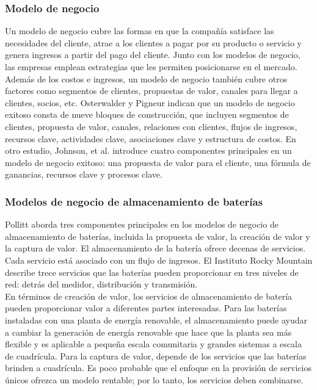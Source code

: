 \documentclass[10pt]{beamer}
\begin{document}
\begin{frame}
\frametitle{Modelo de negocio}
Un modelo de negocio cubre las formas en que la compañía satisface las necesidades del cliente, atrae a los clientes a pagar por su producto o servicio y genera ingresos a partir del pago del cliente. Junto con los modelos de negocio, las empresas emplean estrategias que les permiten posicionarse en el mercado. Además de los costos e ingresos, un modelo de negocio también cubre otros factores como segmentos de clientes, propuestas de valor, canales para llegar a clientes, socios, etc. Osterwalder y Pigneur indican que un modelo de negocio exitoso consta de nueve bloques de construcción, que incluyen segmentos de clientes, propuesta de valor, canales, relaciones con clientes, flujos de ingresos, recursos clave, actividades clave, asociaciones clave y estructura de costos. En otro estudio, Johnson, et al. introduce cuatro componentes principales en un modelo de negocio exitoso: una propuesta de valor para el cliente, una fórmula de ganancias, recursos clave y procesos clave.
\end{frame}
\begin{frame}
\frametitle{Modelos de negocio de almacenamiento de baterías}
Pollitt aborda tres componentes principales en los modelos de negocio de almacenamiento de baterías, incluida la propuesta de valor, la creación de valor y la captura de valor. El almacenamiento de la batería ofrece decenas de servicios. Cada servicio está asociado con un flujo de ingresos. El Instituto Rocky Mountain describe trece servicios que las baterías pueden proporcionar en tres niveles de red: detrás del medidor, distribución y transmisión.\\
En términos de creación de valor, los servicios de almacenamiento de batería pueden proporcionar valor a diferentes partes interesadas. Para las baterías instaladas con una planta de energía renovable, el almacenamiento puede ayudar a cambiar la generación de energía renovable que hace que la planta sea más flexible y es aplicable a pequeña escala comunitaria y grandes sistemas a escala de cuadrícula. Para la captura de valor, depende de los servicios que las baterías brinden a cuadrícula. Es poco probable que el enfoque en la provisión de servicios únicos ofrezca un modelo rentable; por lo tanto, los servicios deben combinarse.
\end{frame}
\end{document}
